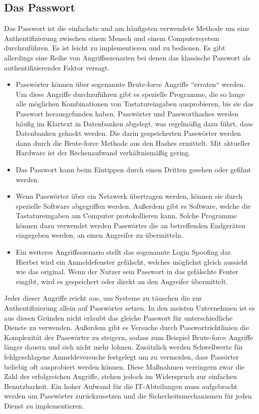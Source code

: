 \documentclass[
book,
a4paper,   
titlepage,  
halfparskip,
12pt        
]{scrartcl}
\begin{document}
\begin{onehalfspacing}
\subsection{Das Passwort}
\label{subsec:pass}
Das Passwort ist die einfachste und am häufigsten verwendete Methode um eine Authentifizierung zwischen einem Mensch und einem Computersystem durchzuführen. Es ist leicht zu implementieren und zu bedienen. Es gibt allerdings eine Reihe von Angriffsszenarien bei denen das klassische Passwort als authentifizierender Faktor versagt.
\begin{itemize}
	\item Passwörter können über sogenannte Brute-force Angriffe ``erraten`` werden. Um diese Angriffe durchzuführen gibt es spezielle Programme, die so lange alle möglichen Kombinationen von Tastatureingaben ausprobieren, bis sie das Passwort herausgefunden haben. Passwörter und Passworthashes werden häufig im Klartext in Datenbanken abgelegt, was regelmäßig dazu führt, dass Datenbanken gehackt werden. Die darin gespeicherten Passwörter werden dann durch die Brute-force Methode aus den Hashes ermittelt. Mit aktueller Hardware ist der Rechenaufwand verhältnismäßig gering.\cite{brute}  
	\item Das Passwort kann beim Eintippen durch einen Dritten gesehen oder gefilmt werden. 
	\item Wenn Passwörter über ein Netzwerk übertragen werden, können sie durch spezielle Software abgegriffen werden. Außerdem gibt es Software, welche die Tastatureingaben am Computer protokollieren kann. Solche Programme können dazu verwendet werden Passwörter die an betreffenden Endgeräten eingegeben werden, an einen Angreifer zu übermitteln.\cite{key}
	\item Ein weiteres Angriffsszenario stellt das sogenannte Login Spoofing dar. Hierbei wird ein Anmeldefenster gefälscht, welches möglichst gleich aussieht wie das original. Wenn der Nutzer sein Passwort in das gefälschte Fenter eingibt, wird es gespeichert oder direkt an den Angreifer übermittelt.\cite{spoofing}
\end{itemize}
Jeder dieser Angriffe reicht aus, um Systeme zu täuschen die zur Authentifizierung allein auf Passwörter setzen. In den meisten Unternehmen ist es aus diesen Gründen nicht erlaubt das gleiche Passwort für unterschiedliche Dienste zu verwenden. Außerdem gibt es Versuche durch Passwortrichtlinien die Komplexität der Passwörter zu steigern, sodass zum Beispiel Brute-force Angriffe länger dauern und sich nicht mehr lohnen. Zusätzlich werden Schwellwerte für fehlgeschlagene Anmeldeversuche festgelegt um zu vermeiden, dass Passörter beliebig oft ausprobiert werden können. Diese Maßnahmen verringern zwar die Zahl der erfolgreichen Angriffe, stehen jedoch im Widerspruch zur einfachen Benutzbarkeit. Ein hoher Aufwand für die \ac{IT}-Abteilungen muss aufgebracht werden um Passwörter zurückzusetzen und die Sicherheitsmechanismen für jeden Dienst zu implementieren.\cite[S. 3ff]{hong}\\

\end{onehalfspacing}
\end{document}

